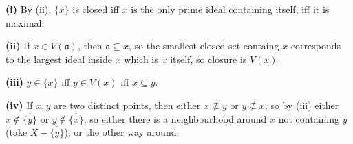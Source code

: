 \textbf{(i)} By (ii), $\{x\}$ is closed iff $x$ is the only prime ideal containing itself, iff it is maximal.

\textbf{(ii)} If $x\in V(\mathfrak a)$, then $\mathfrak a\subseteq x$, so the smallest closed set containg $x$ corresponds to the largest ideal inside $x$ which is $x$ itself, so closure is $V(x)$.

\textbf{(iii)} $y\in\overline{\{x\}}$ iff $y\in V(x)$ iff $x\subseteq y$.

\textbf{(iv)} If $x,y$ are two distinct points, then either $x\nsubseteq y$ or $y\nsubseteq x$, so by (iii) either $x\notin\overline{\{y\}}$ or $y\notin\overline{\{x\}}$, so either there is a neighbourhood around $x$ not containing $y$ (take $X-\overline{\{y\}}$), or the other way around.
